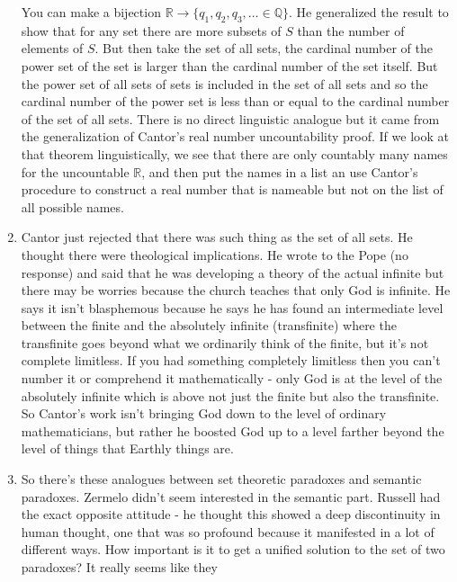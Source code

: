 \documentclass[12pt]{article}
\theoremstyle{definition}
\begin{document}
\begin{enumerate}
        You can make a bijection $\mathbb{R} \rightarrow \{q_1, q_2, q_3,
        \ldots \in \mathbb{Q}\}$. He generalized the result to show that for
        any set there are more subsets of $S$ than the number of elements of
        $S$. But then take the set of all sets, the cardinal number of the
        power set of the set is larger than the cardinal number of the set
        itself. But the power set of all sets of sets is included in the set of
        all sets and so the cardinal number of the power set is less than or
        equal to the cardinal number of the set of all sets. There is no direct
        linguistic analogue but it came from the generalization of Cantor's
        real number uncountability proof. If we look at that theorem
        linguistically, we see that there are only countably many names for the
        uncountable $\mathbb{R}$, and then put the names in a list an use
        Cantor's procedure to construct a real number that is nameable but not
        on the list of all possible names.
    \item
        Cantor just rejected that there was such thing as the set of all sets.
        He thought there were theological implications. He wrote to the Pope
        (no response) and said that he was developing a theory of the actual
        infinite but there may be worries because the church teaches that only
        God is infinite. He says it isn't blasphemous because he says he has
        found an intermediate level between the finite and the absolutely
        infinite (transfinite) where the transfinite goes beyond what we
        ordinarily think of the finite, but it's not complete limitless. If you
        had something completely limitless then you can't number it or
        comprehend it mathematically - only God is at the level of the
        absolutely infinite which is above not just the finite but also the
        transfinite. So Cantor's work isn't bringing God down to the level of
        ordinary mathematicians, but rather he boosted God up to a level
        farther beyond the level of things that Earthly things are. 
    \item
        So there's these analogues between set theoretic paradoxes and semantic
        paradoxes. Zermelo didn't seem interested in the semantic part. Russell
        had the exact opposite attitude - he thought this showed a deep
        discontinuity in human thought, one that was so profound because it
        manifested in a lot of different ways. How important is it to get a
        unified solution to the set of two paradoxes? It really seems like they

\end{enumerate}
\end{document}
